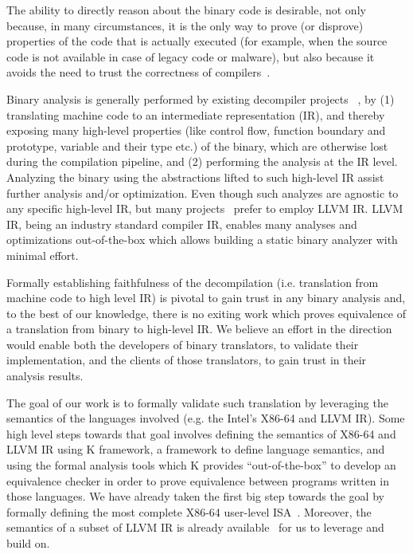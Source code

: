 
The ability to directly reason about the binary code is desirable, not only
because, in many circumstances, it is the only way to prove (or disprove)
  properties of the code that is actually executed (for example, when the
      source code is not available in case of legacy code or malware), but also
  because it avoids the need to trust the correctness of
  compilers~\cite{Thompson,WYSINWYE}.

Binary analysis is generally performed by existing decompiler projects
~\cite{McSema:Recon14,Remill,Angr1,BAP:CAV11,Radare2}, by (1) translating
machine code to an intermediate representation (IR), and thereby exposing many
high-level properties (like control flow, function boundary and prototype,
    variable and their type etc.) of the binary, which are otherwise lost
during the compilation pipeline, and (2) performing the analysis at the IR
level.  Analyzing the binary using the abstractions lifted to such high-level
IR assist further analysis and/or optimization. Even though such analyzes are
agnostic to any specific high-level IR, but many
projects~\cite{McSema:Recon14,Remill,FCD,reopt,llvm-mctoll} prefer to employ
LLVM IR. LLVM IR, being an industry standard compiler IR, enables many analyses
and optimizations out-of-the-box which allows building a static binary analyzer
with minimal effort.

Formally establishing faithfulness of the decompilation (i.e. translation from
    machine code to high level IR) is pivotal to gain trust in any binary
analysis and, to the best of our knowledge, there is no exiting work which
proves equivalence of a translation from binary to high-level IR.  
We believe an effort in the
direction would enable both the developers of binary translators, to validate their implementation, and the clients of those translators, to gain trust in their analysis results.

The goal of our work is to formally validate such translation by leveraging the
semantics of the languages involved (e.g. the Intel's X86-64 and LLVM IR). Some
high level steps towards that goal involves defining the semantics of X86-64
and LLVM IR using K framework, a framework to define language semantics, and
using the formal analysis tools which K provides ``out-of-the-box'' to develop
an equivalence checker in order to prove equivalence between programs written in
those languages.  We have already taken the first big step towards the goal by
formally defining the most complete X86-64 user-level
ISA~\cite{DasguptaAdve:PLDI19}. Moreover, the semantics of a subset of LLVM IR
is already available~\cite{LLVMSEMA} for us to leverage and build on.

